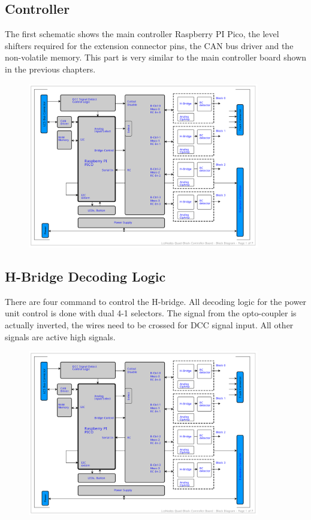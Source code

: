 \subsection{Controller}

The first schematic shows the main controller Raspberry PI Pico, the level shifters required for the extension connector pins, the CAN bus driver and the non-volatile memory. This part is very similar to the main controller board shown in the previous chapters.

\begin{figure}[htbp]
    \centering
    \includegraphics[page=2, width=0.9\textwidth]{./Schematics/Schematic_LcsNodes-Quad-Block-Controller.pdf}
\end{figure}
\FloatBarrier

\subsection{H-Bridge Decoding Logic}

There are four command to control the H-bridge. All decoding logic for the power unit control is done with dual 4-1 selectors. The signal from the opto-coupler is actually inverted, the wires need to be crossed for DCC signal input. All other signals are active high signals. 

\begin{figure}[htbp]
    \centering
    \includegraphics[page=3, width=0.9\textwidth]{./Schematics/Schematic_LcsNodes-Quad-Block-Controller.pdf}
\end{figure}
\FloatBarrier

